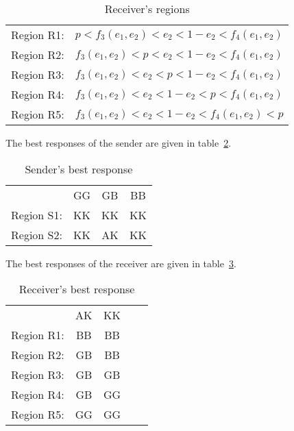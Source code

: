 \documentclass[a4paper,12pt]{article}
\numberwithin{equation}{section}
\begin{document}
\begin{table}[!h]
\begin{center}
\begin{tabular}{lc}
Region R1: & $p<f_{3}(e_{1},e_{2})<e_{2}<1-e_{2}<f_{4}(e_{1},e_{2})$\\
Region R2: & $f_{3}(e_{1},e_{2})<p<e_{2}<1-e_{2}<f_{4}(e_{1},e_{2})$\\
Region R3: & $f_{3}(e_{1},e_{2})<e_{2}<p<1-e_{2}<f_{4}(e_{1},e_{2})$\\
Region R4: & $f_{3}(e_{1},e_{2})<e_{2}<1-e_{2}<p<f_{4}(e_{1},e_{2})$\\
Region R5: & $f_{3}(e_{1},e_{2})<e_{2}<1-e_{2}<f_{4}(e_{1},e_{2})<p$
\end{tabular}
\end{center}
\caption{Receiver's regions}
\label{tab:Appendix/Cue Game with Unobservable Amplification/RegionR}
\end{table}

The best responses of the sender are given in table~\ref{tab:Appendix/Cue Game with Unobservable Amplification/BestResponseS}.
\begin{table}[!h]
\begin{center}
\begin{tabular}{lccc}
 & GG & GB & BB\\
Region S1: & KK & KK & KK\\
Region S2: & KK & AK & KK
\end{tabular}
\end{center}
\caption{Sender's best response}
\label{tab:Appendix/Cue Game with Unobservable Amplification/BestResponseS}
\end{table}

The best responses of the receiver are given in table~\ref{tab:Appendix/Cue Game with Unobservable Amplification/BestResponseR}.
\begin{table}[!h]
\begin{center}
\begin{tabular}{lcccc}
 & AK & KK\\
Region R1: & BB & BB\\
Region R2: & GB & BB\\
Region R3: & GB & GB\\
Region R4: & GB & GG\\
Region R5: & GG & GG
\end{tabular}
\end{center}
\caption{Receiver's best response}
\label{tab:Appendix/Cue Game with Unobservable Amplification/BestResponseR}
\end{table}
\end{document}
